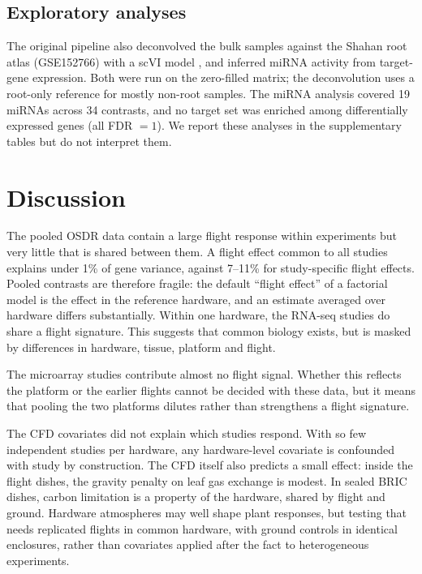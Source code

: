 \documentclass[11pt,a4paper]{article}
\begin{document}
\subsection*{Exploratory analyses}

The original pipeline also deconvolved the bulk samples against the Shahan root atlas (GSE152766) \citep{shahan2022} with a scVI model \citep{lopez2018}, and inferred miRNA activity from target-gene expression. Both were run on the zero-filled matrix; the deconvolution uses a root-only reference for mostly non-root samples. The miRNA analysis covered 19 miRNAs across 34 contrasts, and no target set was enriched among differentially expressed genes (all FDR $= 1$). We report these analyses in the supplementary tables but do not interpret them.

\section*{Discussion}

The pooled OSDR data contain a large flight response within experiments but very little that is shared between them. A flight effect common to all studies explains under 1\% of gene variance, against 7--11\% for study-specific flight effects. Pooled contrasts are therefore fragile: the default ``flight effect'' of a factorial model is the effect in the reference hardware, and an estimate averaged over hardware differs substantially. Within one hardware, the RNA-seq studies do share a flight signature. This suggests that common biology exists, but is masked by differences in hardware, tissue, platform and flight.

The microarray studies contribute almost no flight signal. Whether this reflects the platform or the earlier flights cannot be decided with these data, but it means that pooling the two platforms dilutes rather than strengthens a flight signature.

The CFD covariates did not explain which studies respond. With so few independent studies per hardware, any hardware-level covariate is confounded with study by construction. The CFD itself also predicts a small effect: inside the flight dishes, the gravity penalty on leaf gas exchange is modest. In sealed BRIC dishes, carbon limitation is a property of the hardware, shared by flight and ground. Hardware atmospheres may well shape plant responses, but testing that needs replicated flights in common hardware, with ground controls in identical enclosures, rather than covariates applied after the fact to heterogeneous experiments.
\end{document}
